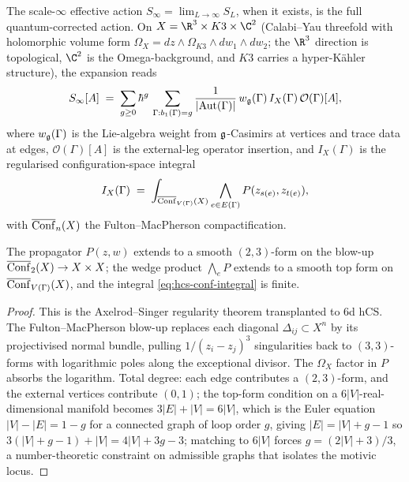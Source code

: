 The scale-$\infty$ effective action
$S_{\infty} = \lim_{L\to\infty}S_{L}$, when it exists, is the full
quantum-corrected action. On
$X = \R^{3}\times K3\times\C^{2}$ (Calabi--Yau threefold with
holomorphic volume form $\Omega_{X} = dz\wedge\Omega_{K3}\wedge dw_{1}\wedge dw_{2}$;
the $\R^{3}$ direction is topological, $\C^{2}$ is the Omega-background,
and $K3$ carries a hyper-K\"ahler structure), the expansion reads
\begin{equation}\label{eq:hcs-feynman-expansion}
 S_{\infty}[A]
 \;=\;
 \sum_{g\ge 0}\hbar^{g}\,
 \sum_{\Gamma:b_{1}(\Gamma) = g}
 \frac{1}{|\mathrm{Aut}(\Gamma)|}\,
 w_{\mathfrak{g}}(\Gamma)\,
 I_{X}(\Gamma)\,
 \mathcal{O}(\Gamma)[A],
\end{equation}
where $w_{\mathfrak{g}}(\Gamma)$ is the Lie-algebra weight from $\mathfrak{g}$-Casimirs at
vertices and trace data at edges, $\mathcal{O}(\Gamma)[A]$ is the
external-leg operator insertion, and $I_{X}(\Gamma)$ is the
regularised configuration-space integral
\begin{equation}\label{eq:hcs-conf-integral}
 I_{X}(\Gamma)
 \;=\;
 \int_{\overline{\mathrm{Conf}}_{V(\Gamma)}(X)}
 \bigwedge_{e\in E(\Gamma)} P(z_{s(e)},z_{t(e)}),
\end{equation}
with $\overline{\mathrm{Conf}}_{n}(X)$ the Fulton--MacPherson compactification.

\begin{proposition}
\label{prop:hcs-integrand-regular}
\ClaimStatusProvedElsewhere
The propagator $P(z,w)$ extends to a smooth $(2,3)$-form on the
blow-up $\overline{\mathrm{Conf}}_{2}(X)\to X\times X$; the wedge product
$\bigwedge_{e}P$ extends to a smooth top form on
$\overline{\mathrm{Conf}}_{V(\Gamma)}(X)$, and the integral
\eqref{eq:hcs-conf-integral} is finite.
\end{proposition}

\begin{proof}
This is the Axelrod--Singer regularity theorem
\cite{Kon94} transplanted to 6d hCS. The Fulton--MacPherson blow-up
replaces each diagonal $\Delta_{ij}\subset X^{n}$ by its projectivised
normal bundle, pulling $1/(z_{i}-z_{j})^{3}$ singularities back to
$(3,3)$-forms with logarithmic poles along the exceptional divisor. The
$\Omega_{X}$ factor in $P$ absorbs the logarithm. Total degree:
each edge contributes a $(2,3)$-form, and the external vertices
contribute $(0,1)$; the top-form condition on a $6|V|$-real-dimensional
manifold becomes $3|E|+|V|=6|V|$, which is the Euler equation
$|V|-|E| = 1-g$ for a connected graph of loop order $g$, giving
$|E| = |V|+g-1$ so $3(|V|+g-1)+|V| = 4|V|+3g-3$; matching to
$6|V|$ forces $g = (2|V|+3)/3$, a number-theoretic constraint on
admissible graphs that isolates the motivic locus.
\end{proof}

